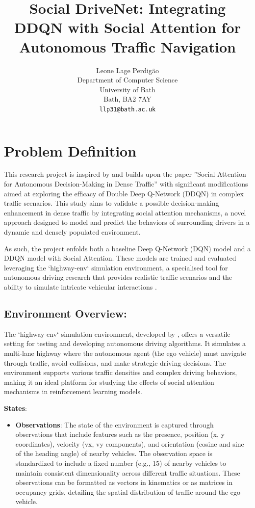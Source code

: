 \documentclass{article}
\title{Social DriveNet: Integrating DDQN with Social Attention for Autonomous Traffic Navigation}
\author{
  Leone Lage Perdigão
  \\
  Department of Computer Science\\
  University of Bath\\
  Bath, BA2 7AY \\
  \texttt{llp31@bath.ac.uk} \\
}
\begin{document}
\maketitle

\section{Problem Definition}

This research project is inspired by and builds upon the paper ''Social Attention for Autonomous Decision-Making in Dense Traffic'' \citep{leurent2019social} with significant modifications aimed at exploring the efficacy of Double Deep Q-Network (DDQN) in complex traffic scenarios. This study aims to validate a possible decision-making enhancement in dense traffic by integrating social attention mechanisms, a novel approach designed to model and predict the behaviors of surrounding drivers in a dynamic and densely populated environment.

As such, the project enfolds both a baseline Deep Q-Network (DQN) model and a DDQN model with Social Attention. These models are trained and evaluated leveraging the `highway-env` simulation environment, a specialised tool for autonomous driving research that provides realistic traffic scenarios and the ability to simulate intricate vehicular interactions \citep{highway-env}.

\subsection{Environment Overview:}
The `highway-env` simulation environment, developed by \citet{highway-env}, offers a versatile setting for testing and developing autonomous driving algorithms. It simulates a multi-lane highway where the autonomous agent (the ego vehicle) must navigate through traffic, avoid collisions, and make strategic driving decisions. The environment supports various traffic densities and complex driving behaviors, making it an ideal platform for studying the effects of social attention mechanisms in reinforcement learning models.

\textbf{States}:
\begin{itemize}
  \item \textbf{Observations}: The state of the environment is captured through observations that include features such as the presence, position (x, y coordinates), velocity (vx, vy components), and orientation (cosine and sine of the heading angle) of nearby vehicles. The observation space is standardized to include a fixed number (e.g., 15) of nearby vehicles to maintain consistent dimensionality across different traffic situations. These observations can be formatted as vectors in kinematics or as matrices in occupancy grids, detailing the spatial distribution of traffic around the ego vehicle.
\end{itemize}
\end{document}
